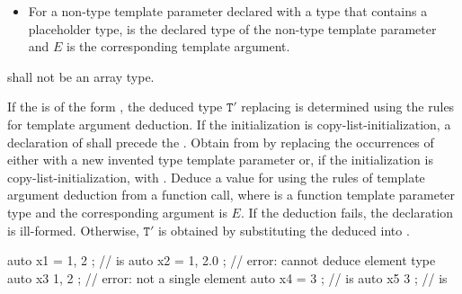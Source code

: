 \begin{itemize}
\begin{itemize}
\item
If the initializer is a ,
it shall consist of a single brace-enclosed 
and $E$ is the .
\item
If the initializer is a parenthesized ,
the  shall be
a single 
and $E$ is the .
\end{itemize}
\item
For a non-type template parameter declared with a type
that contains a placeholder type,
 is the declared type of the non-type template parameter
and $E$ is the corresponding template argument.
\end{itemize}

 shall not be an array type.

\pnum
If the  is of the form
 ,
the deduced type
$\mathtt{T}'$ replacing 
is determined using the rules for template argument deduction.
If the initialization is copy-list-initialization,
a declaration of 
shall precede
the .
Obtain  from
 by replacing the occurrences of
  either with
a new invented type template parameter  or,
if the initialization is copy-list-initialization, with
. Deduce a value for  using the rules
of template argument deduction from a function call,
where  is a
function template parameter type and
the corresponding argument is $E$.
If the deduction fails, the declaration is ill-formed.
Otherwise, $\mathtt{T}'$ is obtained by
substituting the deduced  into .
\begin{example}
\begin{codeblock}
auto x1 = { 1, 2 };             //  is 
auto x2 = { 1, 2.0 };           // error: cannot deduce element type
auto x3{ 1, 2 };                // error: not a single element
auto x4 = { 3 };                //  is 
auto x5{ 3 };                   //  is 
\end{codeblock}
\end{example}

